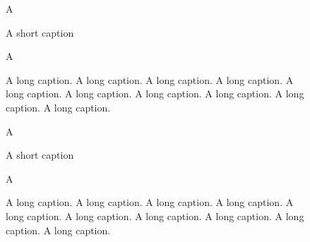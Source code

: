 \documentclass{article}
\begin{document}
\begin{figure}
\centering A
\caption{A short caption}
\end{figure}

\begin{figure}
\centering A
\caption{A long caption. A long caption. A long caption. A long caption. A long caption. A long caption. A long caption. A long caption. A long caption. A long caption.}
\end{figure}

\clearpage
\captionsetup{slc=off}

\begin{figure}
A
\caption{A short caption}
\end{figure}

\begin{figure}
A
\caption{A long caption. A long caption. A long caption. A long caption. A long caption. A long caption. A long caption. A long caption. A long caption. A long caption.}
\end{figure}
\end{document}

